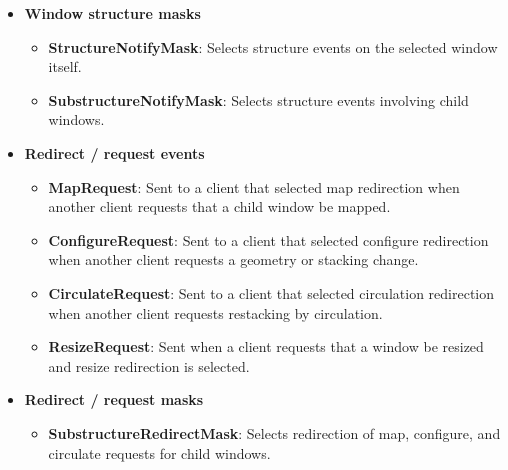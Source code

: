 \documentclass{report}
\begin{document}
\begin{itemize}
\begin{itemize}
                \item \textbf{MapNotify}: Generated when a window becomes mapped.
                \item \textbf{ReparentNotify}: Generated when a window is reparented.
                \item \textbf{ConfigureNotify}: Generated when a window's size, position, border width, or stacking order changes.
                \item \textbf{GravityNotify}: Generated when a window is moved because of bit gravity or window gravity.
                \item \textbf{CirculateNotify}: Generated when a window is restacked to the top or bottom.
            \end{itemize}
        \item \textbf{Window structure masks}
            \bigbreak \noindent
            \begin{itemize}
                \item \textbf{StructureNotifyMask}: Selects structure events on the selected window itself.
                \item \textbf{SubstructureNotifyMask}: Selects structure events involving child windows.
            \end{itemize}
        \item \textbf{Redirect / request events}
            \bigbreak \noindent
            \begin{itemize}
                \item \textbf{MapRequest}: Sent to a client that selected map redirection when another client requests that a child window be mapped.
                \item \textbf{ConfigureRequest}: Sent to a client that selected configure redirection when another client requests a geometry or stacking change.
                \item \textbf{CirculateRequest}: Sent to a client that selected circulation redirection when another client requests restacking by circulation.
                \item \textbf{ResizeRequest}: Sent when a client requests that a window be resized and resize redirection is selected.
            \end{itemize}
        \item \textbf{Redirect / request masks}
            \bigbreak \noindent
            \begin{itemize}
                \item \textbf{SubstructureRedirectMask}: Selects redirection of map, configure, and circulate requests for child windows.

\end{itemize}
\end{itemize}
\end{document}
